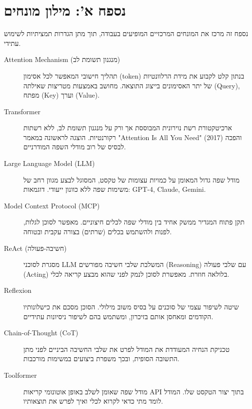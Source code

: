 \chapter*{נספח א': מילון מונחים}

נספח זה מרכז את המונחים המרכזיים המופיעים בעבודה, תוך מתן הגדרות תמציתיות לשימוש עתידי.

\begin{description}

\item[\textenglish{Attention Mechanism} (מנגנון תשומת לב)]
תהליך חישובי המאפשר לכל אסימון (\textenglish{token}) בנתון קלט לקבוע את מידת הרלוונטיות של יתר האסימונים בייצוג התוצאה. מחושב באמצעות מטריצות שאילתה (\textenglish{Query}), מפתח (\textenglish{Key}) וערך (\textenglish{Value}).

\item[\textenglish{Transformer}]
ארכיטקטורת רשת נוירונית המבוססת אך ורק על מנגנון תשומת לב, ללא רשתות רקורנטיות. הוצגה לראשונה במאמר \textenglish{"Attention Is All You Need"} (2017) והפכה לבסיס של רוב מודלי השפה המודרניים.

\item[\textenglish{Large Language Model} (\textenglish{LLM})]
מודל שפה גדול המאומן על כמויות עצומות של טקסט, המסוגל לבצע מגוון רחב של משימות שפה ללא כוונון ייעודי. דוגמאות: \textenglish{GPT-4}, \textenglish{Claude}, \textenglish{Gemini}.

\item[\textenglish{Model Context Protocol} (\textenglish{MCP})]
תקן פתוח המגדיר ממשק אחיד בין מודלי שפה לכלים חיצוניים. מאפשר לסוכן לגלות, לפנות ולהשתמש בכלים (שרתים) בצורה עקבית ובטוחה.

\item[\textenglish{ReAct} (חשיבה-פעולה)]
מסגרת לסוכני \textenglish{LLM} המשלבת שלבי חשיבה מפורשים (\textenglish{Reasoning}) עם שלבי פעולה (\textenglish{Acting}) בלולאה חוזרת. מאפשרת לסוכן לנמק לפני שהוא מבצע קריאה לכלי.

\item[\textenglish{Reflexion}]
שיטה לשיפור עצמי של סוכנים על בסיס משוב מילולי. הסוכן מסכם את כישלונותיו הקודמים ומאחסן אותם בזיכרון, ומשתמש בהם לשיפור ניסיונות עתידיים.

\item[\textenglish{Chain-of-Thought} (\textenglish{CoT})]
טכניקת הנחיה המעודדת את המודל לפרט את שלבי החשיבה הביניים לפני מתן התשובה הסופית, ובכך משפרת ביצועים במשימות מורכבות.

\item[\textenglish{Toolformer}]
מודל שפה שאומן לשלב באופן אוטונומי קריאות \textenglish{API} בתוך יצור הטקסט שלו. המודל לומד מתי כדאי לקרוא לכלי ואיך לפרש את תוצאותיו.


\end{description}
